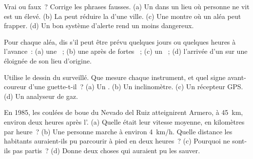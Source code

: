 \begin{exercise}[$\star$]\label{exo:g9:natural-risks:2}
Vrai ou faux~? Corrige les phrases fausses. (a) Un  dans un
lieu où personne ne vit est un  élevé. (b) La  peut
réduire la  d'une ville. (c) Une  montre où un
aléa peut frapper. (d) Un bon système d'alerte rend un  moins
dangereux.
\end{exercise}

\begin{exercise}[$\star$]\label{exo:g9:natural-risks:3}
Pour chaque aléa, dis s'il peut être prévu quelques jours ou quelques
heures à l'avance~: (a) une ~; (b) une  après de fortes
~; (c) un ~; (d) l'arrivée d'un  sur une  éloignée
de son lieu d'origine.
\end{exercise}

\begin{exercise}[$\star$]\label{exo:g9:natural-risks:4}
Utilise le dessin du  surveillé. Que mesure chaque instrument, et
quel signe avant-coureur d'une  guette-t-il~? (a) Un .
(b) Un inclinomètre. (c) Un récepteur GPS. (d) Un analyseur de gaz.
\end{exercise}

\begin{exercise}[$\star\star$]\label{exo:g9:natural-risks:5}
En 1985, les coulées de boue du Nevado del Ruiz atteignirent Armero, à
\qty{45}{km}, environ deux heures après l'. (a) Quelle était leur
vitesse moyenne, en kilomètres par heure~? (b) Une personne marche à
environ \qty{4}{km/h}. Quelle distance les habitants auraient-ils pu
parcourir à pied en deux heures~? (c) Pourquoi ne sont-ils pas partis~?
(d) Donne deux choses qui auraient pu les sauver.
\end{exercise}


